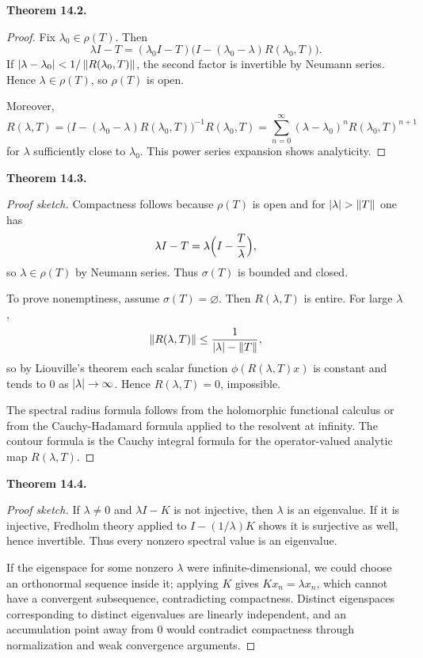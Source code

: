 \documentclass[11pt]{article}
\newenvironment{theoremstmt}[1]{%
  \par\medskip\noindent\textbf{Theorem #1. }\itshape
}{\par\medskip}
\begin{document}
\begin{theoremstmt}{14.2}
\thmResolventAnalytic
\end{theoremstmt}

\begin{proof}
Fix $\lambda_0\in\rho(T)$. Then
\[
\lambda I-T=(\lambda_0 I-T)\bigl(I-(\lambda_0-\lambda)R(\lambda_0,T)\bigr).
\]
If $\left\lvert \lambda-\lambda_0\right\rvert<1/\left\lVert R(\lambda_0,T)\right\rVert$, the second factor is invertible by Neumann series. Hence $\lambda\in\rho(T)$, so $\rho(T)$ is open.

Moreover,
\[
R(\lambda,T)=\bigl(I-(\lambda_0-\lambda)R(\lambda_0,T)\bigr)^{-1}R(\lambda_0,T)
=\sum_{n=0}^{\infty}(\lambda-\lambda_0)^n R(\lambda_0,T)^{n+1}
\]
for $\lambda$ sufficiently close to $\lambda_0$. This power series expansion shows analyticity.
\end{proof}

\begin{theoremstmt}{14.3}
\thmSpectralRadius
\end{theoremstmt}

\begin{proof}[Proof sketch]
Compactness follows because $\rho(T)$ is open and for $\left\lvert \lambda\right\rvert>\left\lVert T\right\rVert$ one has
\[
\lambda I-T=\lambda\Bigl(I-\frac{T}{\lambda}\Bigr),
\]
so $\lambda\in\rho(T)$ by Neumann series. Thus $\sigma(T)$ is bounded and closed.

To prove nonemptiness, assume $\sigma(T)=\varnothing$. Then $R(\lambda,T)$ is entire. For large $\lambda$,
\[
\left\lVert R(\lambda,T)\right\rVert\le \frac{1}{\left\lvert \lambda\right\rvert-\left\lVert T\right\rVert},
\]
so by Liouville's theorem each scalar function $\phi(R(\lambda,T)x)$ is constant and tends to $0$ as $\left\lvert \lambda\right\rvert\to\infty$. Hence $R(\lambda,T)=0$, impossible.

The spectral radius formula follows from the holomorphic functional calculus or from the Cauchy-Hadamard formula applied to the resolvent at infinity. The contour formula is the Cauchy integral formula for the operator-valued analytic map $R(\lambda,T)$.
\end{proof}

\begin{theoremstmt}{14.4}
\thmCompactSpectrum
\end{theoremstmt}

\begin{proof}[Proof sketch]
If $\lambda\neq 0$ and $\lambda I-K$ is not injective, then $\lambda$ is an eigenvalue. If it is injective, Fredholm theory applied to $I-(1/\lambda)K$ shows it is surjective as well, hence invertible. Thus every nonzero spectral value is an eigenvalue.

If the eigenspace for some nonzero $\lambda$ were infinite-dimensional, we could choose an orthonormal sequence inside it; applying $K$ gives $Kx_n=\lambda x_n$, which cannot have a convergent subsequence, contradicting compactness. Distinct eigenspaces corresponding to distinct eigenvalues are linearly independent, and an accumulation point away from $0$ would contradict compactness through normalization and weak convergence arguments.
\end{proof}
\end{document}
